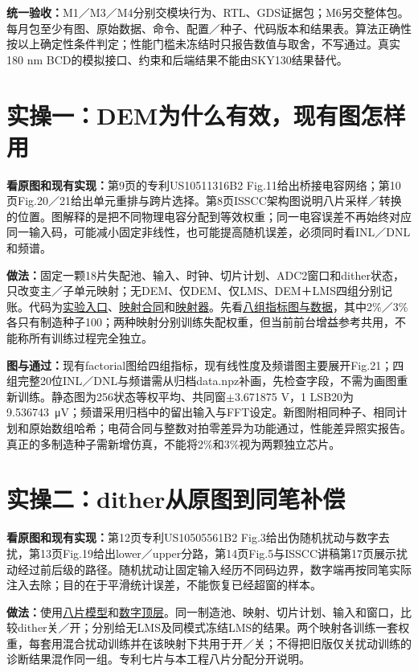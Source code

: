 \documentclass[zihao=5,a4paper,fontset=none]{ctexart}
\begin{document}
\textbf{统一验收：}M1／M3／M4分别交模块行为、RTL、GDS证据包；M6另交整体包。每月包至少有图、原始数据、命令、配置／种子、代码版本和结果表。算法正确性按以上确定性条件判定；性能门槛未冻结时只报告数值与取舍，不写通过。真实180 nm BCD的模拟接口、约束和后端结果不能由SKY130结果替代。


\clearpage
\section{实操一：DEM为什么有效，现有图怎样用}

\textbf{看原图和现有实现：}第9页的专利US10511316B2 Fig.11给出桥接电容网络；第10页Fig.20／21给出单元重排与跨片选择。第8页ISSCC架构图说明八片采样／转换的位置。图解释的是把不同物理电容分配到等效权重；同一电容误差不再始终对应同一输入码，可能减小固定非线性，也可能提高随机误差，必须同时看INL／DNL和频谱。

\textbf{做法：}固定一颗18片失配池、输入、时钟、切片计划、ADC2窗口和dither状态，只改变主／子单元映射；无DEM、仅DEM、仅LMS、DEM＋LMS四组分别记账。代码为\href{../task2/eight/experiment.py}{实验入口}、\href{../task1/BRIDGE_SPEC.md}{映射合同}和\href{../task1/model/fig21_bridge.py}{映射器}。先看\href{../task2/evidence/eight_negative/README.md}{八组指标图与数据}，其中2\%／3\%各只有制造种子100；两种映射分别训练失配权重，但当前前台增益参考共用，不能称所有训练过程完全独立。

\textbf{图与通过：}现有factorial图给四组指标，现有线性度及频谱图主要展开Fig.21；四组完整20位INL／DNL与频谱需从归档data.npz补画，先检查字段，不需为画图重新训练。静态图为256状态等权平均、共同窗$\pm$3.671875 V，1 LSB20为9.536743~μV；频谱采用归档中的留出输入与FFT设定。新图附相同种子、相同计划和原始数组哈希；电荷合同与整数对拍零差异为功能通过，性能差异照实报告。真正的多制造种子需新增仿真，不能将2\%和3\%视为两颗独立芯片。


\clearpage
\section{实操二：dither从原图到同笔补偿}

\textbf{看原图和现有实现：}第12页专利US10505561B2 Fig.3给出伪随机扰动与数字去扰，第13页Fig.19给出lower／upper分路，第14页Fig.5与ISSCC讲稿第17页展示扰动经过前后级的路径。随机扰动让固定输入经历不同码边界，数字端再按同笔实际注入去除；目的在于平滑统计误差，不能恢复已经超窗的样本。

\textbf{做法：}使用\href{../task2/eight/model.py}{八片模型}和\href{../task2/eight_rtl/README.md}{数字顶层}。同一制造池、映射、切片计划、输入和窗口，比较dither关／开；分别给无LMS及同模式冻结LMS的结果。两个映射各训练一套权重，每套用混合扰动训练并在该映射下共用于开／关；不得把旧版仅关扰动训练的诊断结果混作同一组。专利七片与本工程八片分配分开说明。
\end{document}
